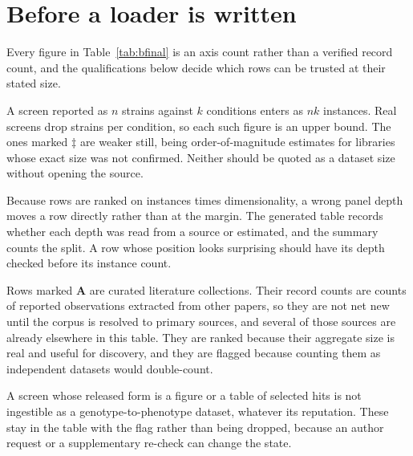 
\section{Before a loader is written}\label{sec:caveats}

Every figure in Table~\ref{tab:bfinal} is an axis count rather than a verified record
count, and the qualifications below decide which rows can be trusted at their stated size.

 A screen reported as
$n$ strains against $k$ conditions enters as $nk$ instances. Real screens drop strains per
condition, so each such figure is an upper bound. The ones marked $\ddagger$ are weaker
still, being order-of-magnitude estimates for libraries whose exact size was not confirmed.
Neither should be quoted as a dataset size without opening the source.

 Because rows are ranked on instances times dimensionality, a wrong panel depth moves
a row directly rather than at the margin. The generated table records whether each depth was
read from a source or estimated, and the summary counts the split. A row whose position
looks surprising should have its depth checked before its instance count.

 Rows marked \textbf{A} are curated literature
collections. Their record counts are counts of reported observations extracted from other
papers, so they are not net new until the corpus is resolved to primary sources, and
several of those sources are already elsewhere in this table. They are ranked because
their aggregate size is real and useful for discovery, and they are flagged because
counting them as independent datasets would double-count.

 A screen whose released
form is a figure or a table of selected hits is not ingestible as a genotype-to-phenotype
dataset, whatever its reputation. These stay in the table with the flag rather than being
dropped, because an author request or a supplementary re-check can change the state.

